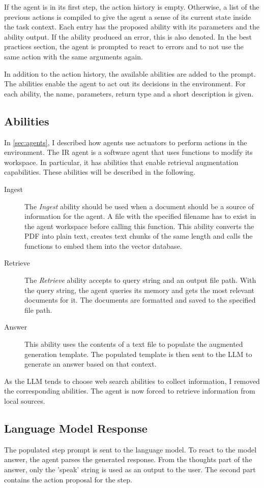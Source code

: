 \documentclass[../main.tex]{subfiles}
\begin{document}
If the agent is in its first step, the action history is empty.
Otherwise, a list of the previous actions is compiled to give the agent a sense of its current state inside the task context.
Each entry has the proposed ability with its parameters and the ability output.
If the ability produced an error, this is also denoted.
In the best practices section, the agent is prompted to react to errors and to not use the same action with the same arguments again.

In addition to the action history, the available abilities are added to the prompt.
The abilities enable the agent to act out its decisions in the environment.
For each ability, the name, parameters, return type and a short description is given.

\subsection{Abilities}

In \autoref{sec:agents}, I described how agents use actuators to perform actions in the environment.
The IR agent is a software agent that uses functions to modify its workspace.
In particular, it has abilities that enable retrieval augmentation capabilities.
These abilities will be described in the following.

\begin{description}
    \item[Ingest] The \emph{Ingest} ability should be used
        when a document should be a source of information for the agent.
        A file with the specified filename has to exist in the agent workspace before calling this function.
        This ability converts the PDF into plain text, creates text chunks of the same length
        and calls the functions to embed them into the vector database.
    \item[Retrieve] The \emph{Retrieve} ability accepts to query string and an output file path.
        With the query string, the agent queries its memory and gets the most relevant documents for it.
        The documents are formatted and saved to the specified file path.
    \item[Answer] This ability uses the contents of a text file to populate the augmented generation template.
        The populated template is then sent to the LLM to generate an answer based on that context.
\end{description}

As the LLM tends to choose web search abilities to collect information, I removed the corresponding abilities.
The agent is now forced to retrieve information from local sources.

\subsection{Language Model Response}

The populated step prompt is sent to the language model.
To react to the model answer, the agent parses the generated response.
From the thoughts part of the answer, only the 'speak' string is used as an output to the user.
The second part contains the action proposal for the step.
\end{document}
